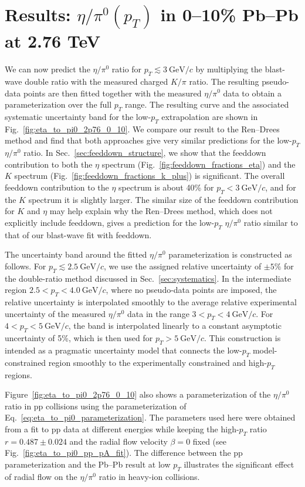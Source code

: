 \documentclass[%
 reprint,
 amsmath,amssymb,
 aps,
prc,
]{revtex4-2}
\begin{document}
\section{\boldmath Results: $\eta/\pi^{0}(p_T)$ in 0--10\% Pb--Pb at 2.76 TeV}

We can now predict the $\eta/\pi^0$ ratio for $p_T \lesssim 3~\mathrm{GeV}/c$ by multiplying the blast-wave double ratio with the measured charged $K/\pi$ ratio. The resulting pseudo-data points are then fitted together with the measured $\eta/\pi^0$ data to obtain a parameterization over the full $p_T$ range. The resulting curve and the associated systematic uncertainty band for the low-$p_T$ extrapolation are shown in Fig.~\ref{fig:eta_to_pi0_2p76_0_10}. We compare our result to the Ren--Drees method and find that both approaches give very similar predictions for the low-$p_T$ $\eta/\pi^0$ ratio. In Sec.~\ref{sec:feeddown_structure}, we show that the feeddown contribution to both the $\eta$ spectrum (Fig.~\ref{fig:feeddown_fractions_eta}) and the $K$ spectrum (Fig.~\ref{fig:feeddown_fractions_k_plus}) is significant. The overall feeddown contribution to the $\eta$ spectrum is about 40\% for $p_T < 3~\mathrm{GeV}/c$, and for the $K$ spectrum it is slightly larger. The similar size of the feeddown contribution for $K$ and $\eta$ may help explain why the Ren--Drees method, which does not explicitly include feeddown, gives a prediction for the low-$p_T$ $\eta/\pi^0$ ratio similar to that of our blast-wave fit with feeddown.

The uncertainty band around the fitted $\eta/\pi^0$ parameterization is constructed as follows. For $p_T \lesssim 2.5~\mathrm{GeV}/c$, we use the assigned relative uncertainty of $\pm 5\%$ for the double-ratio method discussed in Sec.~\ref{sec:systematics}. In the intermediate region $2.5 < p_T < 4.0~\mathrm{GeV}/c$, where no pseudo-data points are imposed, the relative uncertainty is interpolated smoothly to the average relative experimental uncertainty of the measured $\eta/\pi^0$ data in the range $3 < p_T < 4~\mathrm{GeV}/c$. For $4 < p_T < 5~\mathrm{GeV}/c$, the band is interpolated linearly to a constant asymptotic uncertainty of 5\%, which is then used for $p_T > 5~\mathrm{GeV}/c$. This construction is intended as a pragmatic uncertainty model that connects the low-$p_T$ model-constrained region smoothly to the experimentally constrained and high-$p_T$ regions.

Figure~\ref{fig:eta_to_pi0_2p76_0_10} also shows a parameterization of the $\eta/\pi^0$ ratio in pp collisions using the parameterization of Eq.~\ref{eq:eta_to_pi0_parameterization}. The parameters used here were obtained from a fit to pp data at different energies while keeping the high-$p_T$ ratio $r = 0.487 \pm 0.024$ \cite{Ren:2021pzi} and the radial flow velocity $\beta = 0$ fixed (see Fig.~\ref{fig:eta_to_pi0_pp_pA_fit}). The difference between the pp parameterization and the Pb--Pb result at low $p_T$ illustrates the significant effect of radial flow on the $\eta/\pi^0$ ratio in heavy-ion collisions.  
\end{document}
